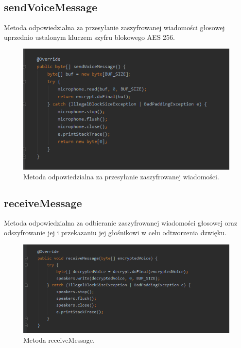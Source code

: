 \subsection{sendVoiceMessage}
Metoda odpowiedzialna za przesyłanie zaszyfrowanej wiadomości głosowej uprzednio ustalonym kluczem szyfru blokowego AES 256.

\begin{figure}[H]
	\includegraphics[width=\textwidth]{images/code5.png}
	\centering	
	\caption{\centering Metoda odpowiedzialna za przesyłanie zaszyfrowanej wiadomości.}
\end{figure}

\subsection{receiveMessage}
Metoda odpowiedzialna za odbieranie zaszyfrowanej wiadomości głosowej oraz odszyfrowanie jej i przekazaniu jej głośnikowi w celu odtworzenia dzwięku.
\begin{figure}[H]
	\includegraphics[width=\textwidth]{images/code6.png}
	\centering	
	\caption{\centering Metoda receiveMessage.}
\end{figure}